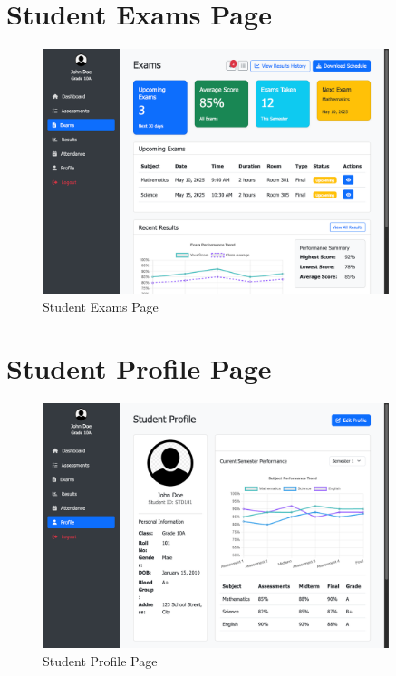 \documentclass[12pt,a4paper]{report}
\begin{document}
\section{Student Exams Page}
\begin{figure}[htbp]
    \centering
    \includegraphics[width=0.9\textwidth]{student-exams-page.png}
    \caption{Student Exams Page}
    \label{fig:student-exams-page}
\end{figure}

\section{Student Profile Page}
\begin{figure}[htbp]
    \centering
    \includegraphics[width=0.9\textwidth]{student-profile-page.png}
    \caption{Student Profile Page}
    \label{fig:student-profile-page}
\end{figure}
\end{document}
